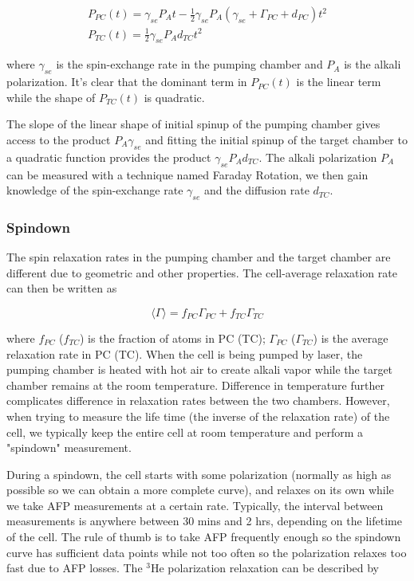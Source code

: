 \begin{subequations}\label{InitialSpinup}
	\begin{gather}
	P_{PC}(t)=\gamma_{se}P_{A}t-\frac{1}{2}\gamma_{se}P_{A}(\gamma_{se}+\Gamma_{PC}+d_{PC})t^{2}\\
	P_{TC}(t)=\frac{1}{2}\gamma_{se}P_{A}d_{TC}t^{2}
	\end{gather}
\end{subequations}

where $\gamma_{se}$ is the spin-exchange rate in the pumping chamber and $P_{A}$ is the alkali polarization. It's clear that the dominant term in $P_{PC}(t)$ is the linear term while the shape of $P_{TC}(t)$ is quadratic. 

The slope of the linear shape of initial spinup of the pumping chamber gives access to the product $P_{A}\gamma_{se}$ and fitting the initial spinup of the target chamber to a quadratic function provides the product $\gamma_{se}P_{A}d_{TC}$. The alkali polarization $P_{A}$ can be measured with a technique named Faraday Rotation, we then gain knowledge of the spin-exchange rate $\gamma_{se}$ and the diffusion rate $d_{TC}$.

\subsubsection{Spindown}

The spin relaxation rates in the pumping chamber and the target chamber are different due to geometric and other properties. The cell-average relaxation rate can then be written as

\begin{equation}
\langle \Gamma \rangle=f_{PC}\Gamma_{PC}+f_{TC}\Gamma_{TC}
\end{equation}

where $f_{PC}$ ($f_{TC}$) is the fraction of atoms in PC (TC); $\Gamma_{PC}$ ($\Gamma_{TC}$) is the average relaxation rate in PC (TC). When the cell is being pumped by laser, the pumping chamber is heated with hot air to create alkali vapor while the target chamber remains at the room temperature. Difference in temperature further complicates difference in relaxation rates between the two chambers. However, when trying to measure the life time (the inverse of the relaxation rate) of the cell, we typically keep the entire cell at room temperature and perform a "spindown" measurement. 

During a spindown, the cell starts with some polarization (normally as high as possible so we can obtain a more complete curve), and relaxes on its own while we take AFP measurements at a certain rate. Typically, the interval between measurements is anywhere between 30 mins and 2 hrs, depending on the lifetime of the cell. The rule of thumb is to take AFP frequently enough so the spindown curve has sufficient data points while not too often so the polarization relaxes too fast due to AFP losses. The $^{3}$He polarization relaxation can be described by

